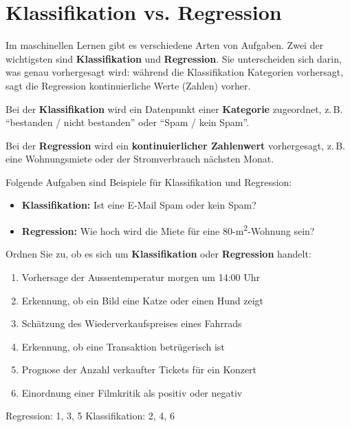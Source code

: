 \section{Klassifikation vs. Regression}

Im maschinellen Lernen gibt es verschiedene Arten von Aufgaben. Zwei der wichtigsten sind
\textbf{Klassifikation} und \textbf{Regression}. Sie unterscheiden sich darin, was genau vorhergesagt wird: während die Klassifikation Kategorien vorhersagt, sagt die Regression kontinuierliche Werte (Zahlen) vorher.

\begin{mydefinition}[Klassifikation]
Bei der \textbf{Klassifikation} wird ein Datenpunkt einer
\textbf{Kategorie} zugeordnet, z.\,B. \enquote{bestanden / nicht bestanden} oder
\enquote{Spam / kein Spam}.
\end{mydefinition}

\begin{mydefinition}[Regression]
Bei der \textbf{Regression} wird ein \textbf{kontinuierlicher Zahlenwert}
vorhergesagt, z.\,B. eine Wohnungsmiete oder der Stromverbrauch nächsten Monat.
\end{mydefinition}

\begin{myexample}
    Folgende Aufgaben sind Beispiele für Klassifikation und Regression:
\begin{itemize}
    \item \textbf{Klassifikation:} Ist eine E-Mail Spam oder kein Spam?
    \item \textbf{Regression:} Wie hoch wird die Miete für eine 80-m\textsuperscript{2}-Wohnung sein?
\end{itemize}
\end{myexample}

\begin{myexercise}
Ordnen Sie zu, ob es sich um \textbf{Klassifikation} oder \textbf{Regression} handelt:
\begin{enumerate}
    \item Vorhersage der Aussentemperatur morgen um 14:00 Uhr
    \item Erkennung, ob ein Bild eine Katze oder einen Hund zeigt
    \item Schätzung des Wiederverkaufspreises eines Fahrrads
    \item Erkennung, ob eine Transaktion betrügerisch ist
    \item Prognose der Anzahl verkaufter Tickets für ein Konzert
    \item Einordnung einer Filmkritik als positiv oder negativ
\end{enumerate}
\begin{myanswer}
Regression: 1, 3, 5 \hspace{1cm} Klassifikation: 2, 4, 6
\end{myanswer}
\end{myexercise}

